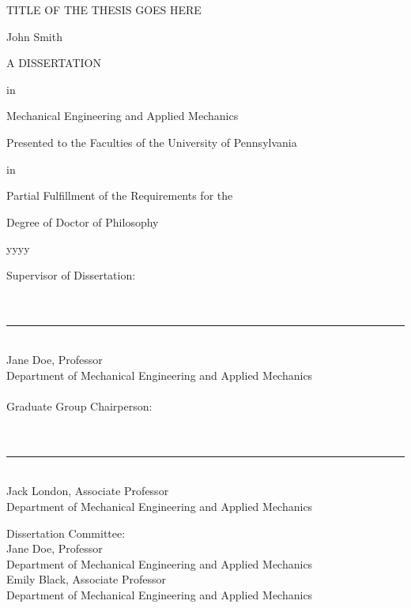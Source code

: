 \documentclass[12pt]{report}
\newcommand{\doublespaced}{\renewcommand{\baselinestretch}{1.5}\normalfont}
\newcommand{\singlespaced}{\renewcommand{\baselinestretch}{1.0}\normalfont}
\numberwithin{equation}{chapter}
\def\thetitle{TITLE OF THE THESIS GOES HERE}
\def\theauthor{John Smith}
\def\theyear{yyyy}
\begin{document}
\doublespaced
\large\newlength{\oldparskip}\setlength\oldparskip{\parskip}\parskip=0.0in
\thispagestyle{empty}
\begin{center}
\thetitle

\vspace*{20pt}

\begin{small}

\theauthor

\vspace*{20pt}

A DISSERTATION 

in 

Mechanical Engineering and Applied Mechanics 

Presented to the Faculties of the University of Pennsylvania

in

Partial Fulfillment of the Requirements for the 

Degree of Doctor of Philosophy

\theyear

\end{small}

\end{center}

\vspace{45pt}

\begin{small}
\singlespaced
\noindent Supervisor of Dissertation:  \\ \\ \\
\noindent \rule[1ex]{3in}{0.3mm}  \\
\noindent Jane Doe, Professor \\
Department of Mechanical Engineering and Applied Mechanics\\ \\ 

\noindent Graduate Group Chairperson: \\ \\ \\
\noindent \rule[1ex]{3in}{0.3mm} \\
\noindent Jack London, Associate Professor \\
Department of Mechanical Engineering and Applied Mechanics \\

\vspace*{15pt}


\singlespaced
\noindent Dissertation Committee: \\
\noindent Jane Doe, Professor \\
Department of Mechanical Engineering and Applied Mechanics \\

\noindent Emily Black, Associate Professor \\
Department of Mechanical Engineering and Applied Mechanics\\

\end{small}
\end{document}
